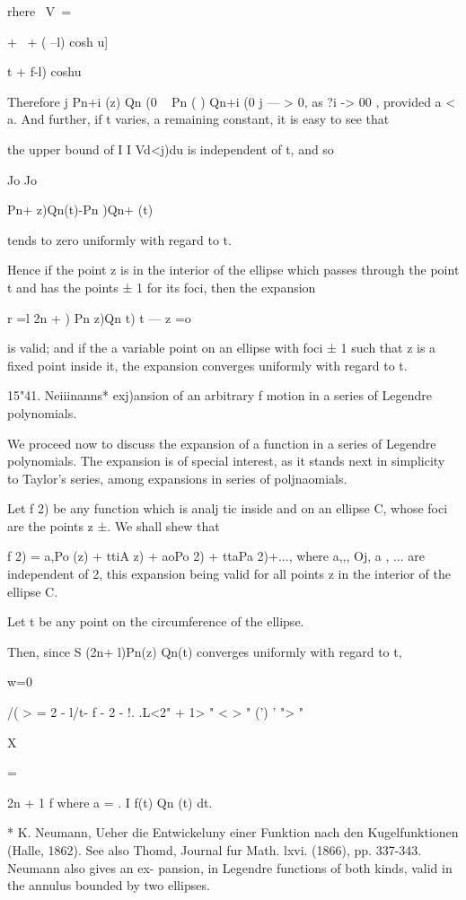 {{{rhere \ V\ =

+ \ + ( --l) cosh u]

t + f-l) coshu

Therefore j Pn+i (z) Qn (0 ~ Pn ( ) Qn+i (0 j — > 0, as ?i -> 00 ,
provided a < a. And further, if t varies, a remaining constant, it is
easy to see that

the upper bound of I I Vd<j)du is independent of t, and so

Jo Jo

Pn+ z)Qn(t)-Pn )Qn+ (t)

tends to zero uniformly with regard to t.

Hence if the point z is in the interior of the ellipse which passes
through the point t and has the points ± 1 for its foci, then the
expansion

r =l 2n + ) Pn z)Qn t) t — z =o

is valid; and if the a variable point on an ellipse with foci ± 1 such
that z is a fixed point inside it, the expansion converges uniformly
with regard to t.

15"41. Neiiinanns* exj)ansion of an arbitrary f motion in a series of
Legendre polynomials.

We proceed now to discuss the expansion of a function in a series of
Legendre polynomials. The expansion is of special interest, as it
stands next in simplicity to Taylor's series, among expansions in
series of poljnaomials.

Let f 2) be any function which is analj tic inside and on an ellipse
C, whose foci are the points z ±. We shall shew that

f 2) = a,Po (z) + ttiA z) + aoPo 2) + ttaPa 2)+..., where a,,, Oj, a ,
... are independent of 2, this expansion being valid for all points z
in the interior of the ellipse C.

Let t be any point on the circumference of the ellipse.

Then, since S (2n+ l)Pn(z) Qn(t) converges uniformly with regard to t,

w=0

/( > = 2 - l/t- f - 2 - !. .L<2" + 1> " < > " (') ' "> "

X

= %

2n + 1 f where a = . I f(t) Qn (t) dt.

* K. Neumann, Ueher die Entwickeluny einer Funktion nach den
Kugelfunktionen (Halle, 1862). See also Thomd, Journal fur Math. lxvi.
(1866), pp. 337-343. Neumann also gives an ex- pansion, in Legendre
functions of both kinds, valid in the annulus bounded by two ellipses.

}}}
